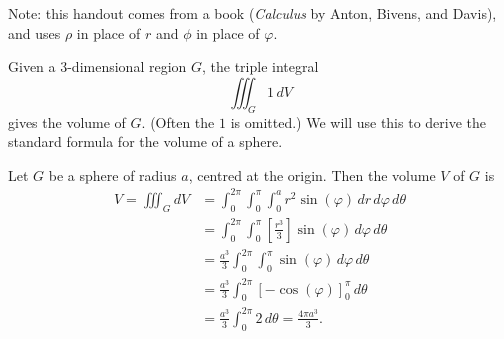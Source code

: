   Note: this handout comes from a book (\emph{Calculus} by Anton, Bivens, and Davis), and uses $\rho$ in place of $r$ and $\phi$ in place of $\varphi$.
  
  \begin{example}
    Given a 3-dimensional region $G$, the triple integral
      \[
        \iiint_G 1 \, dV
      \]
    gives the volume of $G$.  (Often the $1$ is omitted.)  We will use this to derive the standard formula for the volume of a sphere.
    
    Let $G$ be a sphere of radius $a$, centred at the origin.  Then the volume $V$ of $G$ is
      \begin{align*}
        V = \iiint_G dV & = \int_0^{2\pi} \int_0^{\pi} \int_0^a r^2 \sin(\varphi) \, dr \, d\varphi \, d\theta  \\
        & = \int_0^{2\pi} \int_0^{\pi} \left[\frac{r^3}{3}\right] \sin(\varphi) \, d\varphi \, d\theta  \\
        & = \frac{a^3}{3} \int_0^{2\pi} \int_0^{\pi} \sin(\varphi) \, d\varphi \, d\theta  \\
        & = \frac{a^3}{3} \int_0^{2\pi} \left[- \cos(\varphi)\right]_0^{\pi} \, d\theta  \\
        & = \frac{a^3}{3} \int_0^{2\pi} 2 \, d\theta = \frac{4\pi a^3}{3}.
      \end{align*}
  \end{example}
  
  
    
  
  
  
